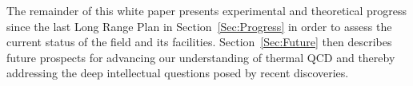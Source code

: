 The remainder of this white paper presents experimental and theoretical progress since the last Long Range Plan in Section~\ref{Sec:Progress} in order to assess the current status of the field and its facilities. Section~\ref{Sec:Future} then describes future prospects for advancing our understanding of thermal QCD and thereby addressing the deep intellectual questions posed by recent discoveries. 
